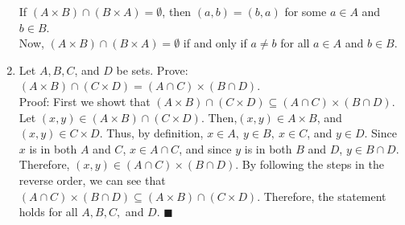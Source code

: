 \documentclass[12pt]{article}
\newcommand{\qed}{\(\blacksquare\)}
\begin{document}
\begin{enumerate}
        If \((A\times B)\cap(B\times A) = \emptyset\), then \((a,b)=(b,a)\) for some \(a\in A\) and \(b\in B\).\\
        Now, \((A\times B)\cap(B\times A) = \emptyset\) if and only if \(a\neq b\) for all \(a \in A\) and \(b \in B\). 
        \item Let \(A, B, C\), and \(D\) be sets. Prove: \((A\times B)\cap(C\times D) = (A\cap C)\times (B\cap D)\).\\ Proof: First we showt that \((A\times B)\cap(C\times D)\subseteq (A\cap C)\times (B\cap D)\). Let \((x,y)\in (A\times B)\cap (C\times D)\). Then,\((x,y)\in A\times B\), and \((x,y)\in C\times D\). Thus, by definition, \(x\in A,\ y\in B,\ x\in C\), and \(y\in D\). Since \(x\) is in both \(A\) and \(C\), \(x\in A\cap C\), and since \(y\) is in both \(B\) and \(D\), \(y\in B\cap D\). Therefore, \((x,y)\in(A\cap C)\times(B\cap D)\). By following the steps in the reverse order, we can see that \((A\cap C)\times (B\cap D)\subseteq (A\times B)\cap(C\times D)\). Therefore, the statement holds for all \(A, B, C,\) and \(D\). \qed
    \end{enumerate}
\end{document}
